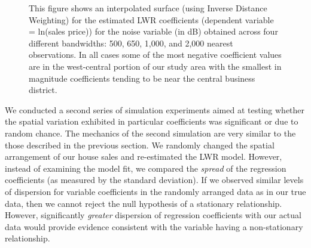 \documentclass{article}\usepackage[]{graphicx}\usepackage[]{color}
\begin{document}
\begin{figure}
 \caption{This figure shows an interpolated surface (using Inverse Distance Weighting) for the estimated LWR coefficients (dependent variable = ln(sales price)) for the noise variable (in dB) obtained across four different bandwidths: 500, 650, 1,000, and 2,000 nearest observations. In all cases some of the most negative coefficient values are in the west-central portion of our study area with the smallest in magnitude coefficients tending to be near the central business district.}
 \label{fig:NoiseBetas}
\end{figure}

We conducted a second series of simulation experiments aimed at testing whether the spatial variation exhibited in particular coefficients was significant or due to random chance. The mechanics of the second simulation are very similar to the those described in the previous section. We randomly changed the spatial arrangement of our house sales and re-estimated the LWR model. However, instead of examining the model fit, we compared the \emph{spread} of the regression coefficients (as measured by the standard deviation). If we observed similar levels of dispersion for variable coefficients in the randomly arranged data as in our true data, then we cannot reject the null hypothesis of a stationary relationship. However, significantly \emph{greater} dispersion of regression coefficients with our actual data would provide evidence consistent with the variable having a non-stationary relationship. 
\end{document}
